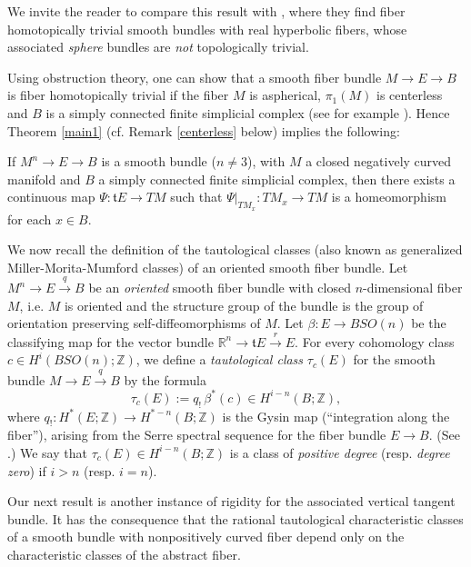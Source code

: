 \documentclass[onecolumn,notitlepage,11pt]{article}
\newcommand{\Z}{\mathbb{Z}}
\newcommand{\R}{\mathbb{R}}
\newcommand{\beq}{\begin{equation*}}
\newcommand{\eeq}{\end{equation*}}
\newenvironment{customcoro}[1]
  {\renewcommand\theinnercustomcoro{#1}\innercustomcoro}
  {\endinnercustomcoro}
\theoremstyle{definition}
\begin{document}
We invite the reader to compare this result with 
\cite[Theorem 1.6]{FarrellGogolev}, where
they find fiber homotopically trivial smooth bundles with 
real hyperbolic fibers, whose associated
\textit{sphere} bundles are \textit{not} topologically trivial.

Using obstruction theory, one can show that 
a smooth fiber bundle $M\to E\to B$ is fiber
homotopically trivial if the fiber $M$ is aspherical, $\pi_1(M)$ is centerless and $B$ is a simply connected finite simplicial complex 
(see for example \cite[Proposition 1.4]{FarrellGogolev}). Hence
Theorem \ref{main1} (cf. Remark \ref{centerless} below) implies the following:

\begin{customcoro}{A.1}\label{simplyconnected}
If $M^n\to E\to B$ is a smooth bundle ($n\neq 3$), with $M$ a closed
negatively curved manifold and $B$ a simply connected finite simplicial complex, then there exists a continuous map
$\Psi: \mathfrak{t}E\to TM$ such that $\Psi|_{TM_x}:TM_x\to TM$ 
is a homeomorphism for each $x\in B$.
\end{customcoro}

We now recall the definition of the tautological classes (also known as
generalized Miller-Morita-Mumford classes)
of an oriented smooth fiber bundle. Let
$M^n\to E\xrightarrow{q} B$ be an \textit{oriented}
 smooth fiber bundle with closed $n$-dimensional
fiber $M$, i.e. $M$ is oriented and the structure group of the bundle is the
group of orientation preserving self-diffeomorphisms of $M$.
Let $\beta: E\to BSO(n)$ be the classifying map for the
vector bundle $\R^n\to \mathfrak{t}E\xrightarrow{r} E$. 
For every cohomology class $c\in H^i(BSO(n);\Z)$, we define
a \textit{tautological class} $\tau_c(E)$ for the smooth bundle 
$M\to E\xrightarrow{q} B$ by the formula
\beq
\tau_c(E):=q_!\, \beta^*(c)\in H^{i-n}(B;\Z),
\eeq
where
$q_!:H^*(E;\Z)\to H^{*-n}(B;\Z)$ is the Gysin map 
(``integration along the fiber''), arising from the Serre
spectral sequence for the fiber bundle $E\to B$. 
(See \cite[pag. 148-150]{moritabook}.)
We  say that $\tau_c(E)\in H^{i-n}(B;\Z)$ is a class of
\textit{positive degree}  (resp. \textit{degree zero}) if 
$i>n$ (resp. $i=n$).

Our next result 
is another instance of rigidity for the
associated vertical tangent bundle. It
has the consequence that the rational tautological
characteristic classes of a smooth bundle with nonpositively
curved fiber depend only on the characteristic classes of the
abstract fiber.
\end{document}
